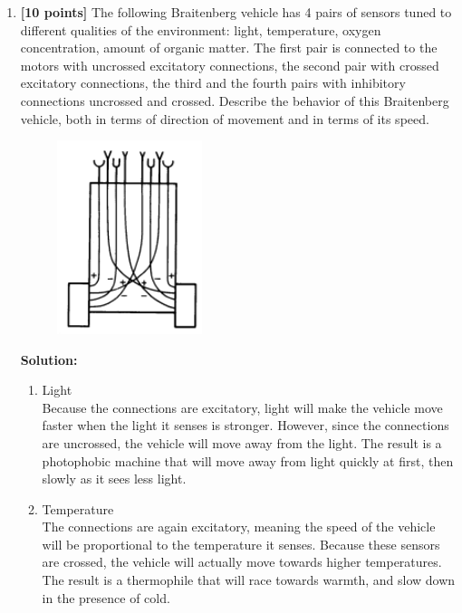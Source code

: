 \documentclass{article}
\begin{document}
\begin{enumerate}
\begin{enumerate}
    \end{enumerate}


\newpage
\item \textbf{[10 points]} The following Braitenberg vehicle has 4 pairs of sensors tuned to different qualities of the environment: light, temperature, oxygen concentration, amount of organic matter. The first pair is connected to the motors with uncrossed excitatory connections, the second pair with crossed excitatory connections, the third and the fourth pairs with inhibitory connections uncrossed and crossed. Describe the behavior of this Braitenberg vehicle, both in terms of direction of movement and in terms of its speed. 

    \begin{figure}[h]
    \centering
    \includegraphics[width = 0.4\textwidth]{Braitenburg_vehicle}
    \label{fig:Braitenburg_vehicle}
    \end{figure}

\textbf{Solution:} 
    \begin{enumerate}
    \item Light \\
    Because the connections are excitatory, light will make the vehicle move faster when the light it senses is stronger. However, since the connections are uncrossed, the vehicle will move away from the light. The result is a photophobic machine that will move away from light quickly at first, then slowly as it sees less light.

    \item Temperature \\
    The connections are again excitatory, meaning the speed of the vehicle will be proportional to the temperature it senses. Because these sensors are crossed, the vehicle will actually move towards higher temperatures. The result is a thermophile that will race towards warmth, and slow down in the presence of cold.


\end{enumerate}
\end{enumerate}
\end{document}
